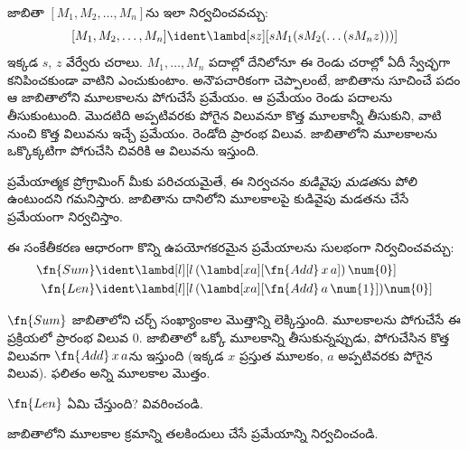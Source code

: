 \documentclass[../../../include/open-logic-section]{subfiles}
\begin{document}

జాబితా $[M_1, M_2, \ldots, M_n]$ను ఇలా నిర్వచించవచ్చు:
\[
  [M_1, M_2, \ldots, M_n] \ident \lambd[sz][s M_1 (s M_2 (\ldots (s M_n z)))]
\]
ఇక్కడ $s$, $z$ వేర్వేరు చరాలు. $M_1, \ldots, M_n$ పదాల్లో దేనిలోనూ ఈ రెండు చరాల్లో ఏదీ స్వేచ్ఛగా కనిపించకుండా వాటిని ఎంచుకుంటాం.
అనౌపచారికంగా చెప్పాలంటే, జాబితాను సూచించే పదం ఆ జాబితాలోని మూలకాలను పోగుచేసే ప్రమేయం. ఆ ప్రమేయం రెండు పదాలను తీసుకుంటుంది. మొదటిది అప్పటివరకు పోగైన విలువనూ కొత్త మూలకాన్నీ తీసుకుని, వాటి నుంచి కొత్త విలువను ఇచ్చే ప్రమేయం. రెండోది ప్రారంభ విలువ. జాబితాలోని మూలకాలను ఒక్కొక్కటిగా పోగుచేసి చివరికి ఆ విలువను ఇస్తుంది.

\begin{digress}
  ప్రమేయాత్మక ప్రోగ్రామింగ్ మీకు పరిచయమైతే, ఈ నిర్వచనం \emph{కుడివైపు మడత}ను పోలి ఉంటుందని గమనిస్తారు. జాబితాను దానిలోని మూలకాలపై కుడివైపు మడతను చేసే ప్రమేయంగా నిర్వచిస్తాం.
\end{digress}

ఈ సంకేతీకరణ ఆధారంగా కొన్ని ఉపయోగకరమైన ప్రమేయాలను సులభంగా నిర్వచించవచ్చు:
\begin{align*}
  \fn{Sum} & \ident
  \lambd[l][l \, (\lambd[xa][\fn{Add} \, x \, a])\,  \num{0}]\\
  \fn{Len} & \ident
  \lambd[l][l \, (\lambd[xa][\fn{Add} \, a \, \num{1}]) \num{0}]
\end{align*}

$\fn{Sum}$ జాబితాలోని చర్చ్ సంఖ్యాంకాల మొత్తాన్ని లెక్కిస్తుంది. మూలకాలను పోగుచేసే ఈ ప్రక్రియలో ప్రారంభ విలువ $\num{0}$. జాబితాలో ఒక్కో మూలకాన్ని తీసుకున్నప్పుడు, పోగుచేసిన కొత్త విలువగా $\fn{Add} \, x\, a$ను ఇస్తుంది (ఇక్కడ $x$ ప్రస్తుత మూలకం, $a$ అప్పటివరకు పోగైన విలువ). ఫలితం అన్ని మూలకాల మొత్తం.

\begin{prob}
  $\fn{Len}$ ఏమి చేస్తుంది? వివరించండి.
\end{prob}

\begin{prob}
  జాబితాలోని మూలకాల క్రమాన్ని తలకిందులు చేసే ప్రమేయాన్ని నిర్వచించండి.
\end{prob}
\end{document}
